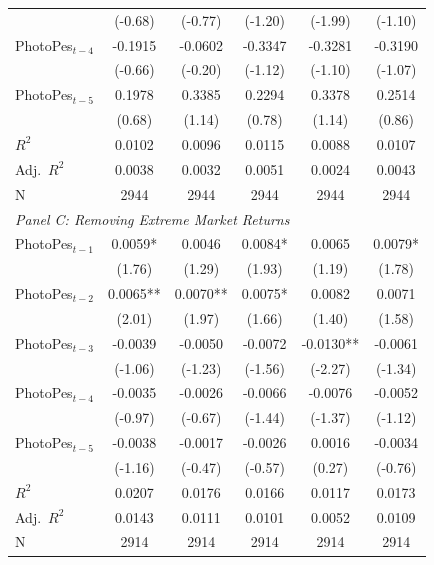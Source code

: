 \documentclass[AER]{AEA}
\begin{document}
\begin{table}[h!]
\begin{tabular}{lccccc}
         & (-0.68) & (-0.77) & (-1.20) & (-1.99) & (-1.10) \\
    PhotoPes$_{t-4}$ & -0.1915 & -0.0602 & -0.3347 & -0.3281 & -0.3190 \\
         & (-0.66) & (-0.20) & (-1.12) & (-1.10) & (-1.07) \\
    PhotoPes$_{t-5}$ & 0.1978 & 0.3385 & 0.2294 & 0.3378 & 0.2514 \\
         & (0.68) & (1.14) & (0.78) & (1.14) & (0.86) \\
    $R^2$ & 0.0102 & 0.0096 & 0.0115 & 0.0088 & 0.0107 \\
    Adj.\ $R^2$ & 0.0038 & 0.0032 & 0.0051 & 0.0024 & 0.0043 \\
    N & 2944 & 2944 & 2944 & 2944 & 2944 \\
    \midrule
    \multicolumn{6}{l}{\textit{Panel C: Removing Extreme Market Returns}} \\
    \midrule
    PhotoPes$_{t-1}$ & 0.0059* & 0.0046 & 0.0084* & 0.0065 & 0.0079* \\
         & (1.76) & (1.29) & (1.93) & (1.19) & (1.78) \\
    PhotoPes$_{t-2}$ & 0.0065** & 0.0070** & 0.0075* & 0.0082 & 0.0071 \\
         & (2.01) & (1.97) & (1.66) & (1.40) & (1.58) \\
    PhotoPes$_{t-3}$ & -0.0039 & -0.0050 & -0.0072 & -0.0130** & -0.0061 \\
         & (-1.06) & (-1.23) & (-1.56) & (-2.27) & (-1.34) \\
    PhotoPes$_{t-4}$ & -0.0035 & -0.0026 & -0.0066 & -0.0076 & -0.0052 \\
         & (-0.97) & (-0.67) & (-1.44) & (-1.37) & (-1.12) \\
    PhotoPes$_{t-5}$ & -0.0038 & -0.0017 & -0.0026 & 0.0016 & -0.0034 \\
         & (-1.16) & (-0.47) & (-0.57) & (0.27) & (-0.76) \\
    $R^2$ & 0.0207 & 0.0176 & 0.0166 & 0.0117 & 0.0173 \\
    Adj.\ $R^2$ & 0.0143 & 0.0111 & 0.0101 & 0.0052 & 0.0109 \\
    N & 2914 & 2914 & 2914 & 2914 & 2914 \\
    \bottomrule
    \end{tabular}


\end{table}
\end{document}
